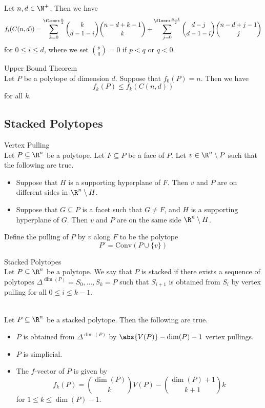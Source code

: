 \documentclass[a4paper]{article}
\begin{document}
\begin{crl}{}{}\\
Let $n,d\in\N^+$. Then we have $$f_i(C(n,d))=\sum_{k=0}^{\floor*{\frac{n}{2}}}\binom{k}{d-1-i}\binom{n-d+k-1}{k}+\sum_{j=0}^{\floor*{\frac{n-1}{2}}}\binom{d-j}{d-1-i}\binom{n-d+j-1}{j}$$ for $0\leq i\leq d$, where we set $\binom{p}{q}=0$ if $p<q$ or $q<0$. 
\end{crl}

\begin{thm}{Upper Bound Theorem}{}\\
Let $P$ be a polytope of dimension $d$. Suppose that $f_0(P)=n$. Then we have $$f_k(P)\leq f_k(C(n,d))$$ for all $k$. 
\end{thm}

\subsection{Stacked Polytopes}
\begin{defn}{Vertex Pulling}{}\\
Let $P\subseteq\R^n$ be a polytope. Let $F\subseteq P$ be a face of $P$. Let $v\in\R^n\setminus P$ such that the following are true. 
\begin{itemize}
\item Suppose that $H$ is a supporting hyperplane of $F$. Then $v$ and $P$ are on different sides in $\R^n\setminus H$. 
\item Suppose that $G\subseteq P$ is a facet such that $G\neq F$, and $H$ is a supporting hyperplane of $G$. Then $v$ and $P$ are on the same side $\R^n\setminus H$. 
\end{itemize}
Define the pulling of $P$ by $v$ along $F$ to be the polytope $$P'=\text{Conv}(P\cup\{v\})$$
\end{defn}

\begin{defn}{Stacked Polytopes}{}\\
Let $P\subseteq\R^n$ be a polytope. We say that $P$ is stacked if there exists a sequence of polytopes $\Delta^{\dim(P)}=S_0,\dots,S_k=P$ such that $S_{i+1}$ is obtained from $S_i$ by vertex pulling for all $0\leq i\leq k-1$. 
\end{defn}

\begin{prp}{}{}\\
Let $P\subseteq\R^n$ be a stacked polytope. Then the following are true. 
\begin{itemize}
\item $P$ is obtained from $\Delta^{\dim(P)}$ by $\abs{V(P)}-\dim(P)-1$ vertex pullings. 
\item $P$ is simplicial. 
\item The $f$-vector of $P$ is given by $$f_k(P)=\binom{\dim(P)}{k}V(P)-\binom{\dim(P)+1}{k+1}k$$ for $1\leq k\leq\dim(P)-1$. 
\end{itemize}
\end{prp}
\end{document}
